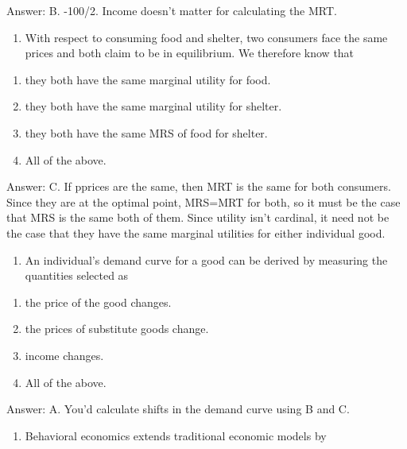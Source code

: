 \documentclass[11pt,]{article}
\providecommand{\tightlist}{%
  \setlength{\itemsep}{0pt}\setlength{\parskip}{0pt}}
\begin{document}
Answer: B. -100/2. Income doesn't matter for calculating the MRT.

\begin{enumerate}
\def\labelenumi{\arabic{enumi})}
\setcounter{enumi}{15}
\tightlist
\item
  With respect to consuming food and shelter, two consumers face the
  same prices and both claim to be in equilibrium. We therefore know
  that
\end{enumerate}

\begin{enumerate}
\def\labelenumi{\Alph{enumi})}
\tightlist
\item
  they both have the same marginal utility for food.
\item
  they both have the same marginal utility for shelter.
\item
  they both have the same MRS of food for shelter.
\item
  All of the above.
\end{enumerate}

Answer: C. If pprices are the same, then MRT is the same for both
consumers. Since they are at the optimal point, MRS=MRT for both, so it
must be the case that MRS is the same both of them. Since utility isn't
cardinal, it need not be the case that they have the same marginal
utilities for either individual good.

\begin{enumerate}
\def\labelenumi{\arabic{enumi})}
\setcounter{enumi}{16}
\tightlist
\item
  An individual's demand curve for a good can be derived by measuring
  the quantities selected as
\end{enumerate}

\begin{enumerate}
\def\labelenumi{\Alph{enumi})}
\tightlist
\item
  the price of the good changes.
\item
  the prices of substitute goods change.
\item
  income changes.
\item
  All of the above.
\end{enumerate}

Answer: A. You'd calculate shifts in the demand curve using B and C.

\begin{enumerate}
\def\labelenumi{\arabic{enumi})}
\setcounter{enumi}{17}
\tightlist
\item
  Behavioral economics extends traditional economic models by
\end{enumerate}
\end{document}
